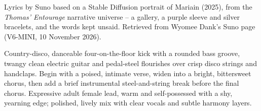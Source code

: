 
\label{sec:the-unfinished-line}
\begin{notes}
Lyrics by Suno based on a Stable Diffusion portrait of Mariain (2025), from the \emph{Thomas' Entourage} narrative universe -- a gallery, a purple sleeve and silver bracelets, and the words kept unsaid. Retrieved from Wyomee Dank's Suno page (V6-MINI, 10 November 2026).
\end{notes}
\begin{style}
Country-disco, danceable four-on-the-floor kick with a rounded bass groove, twangy clean electric guitar and pedal-steel flourishes over crisp disco strings and handclaps. Begin with a poised, intimate verse, widen into a bright, bittersweet chorus, then add a brief instrumental steel-and-string break before the final chorus. Expressive adult female lead, warm and self-possessed with a shy, yearning edge; polished, lively mix with clear vocals and subtle harmony layers.
\end{style}
